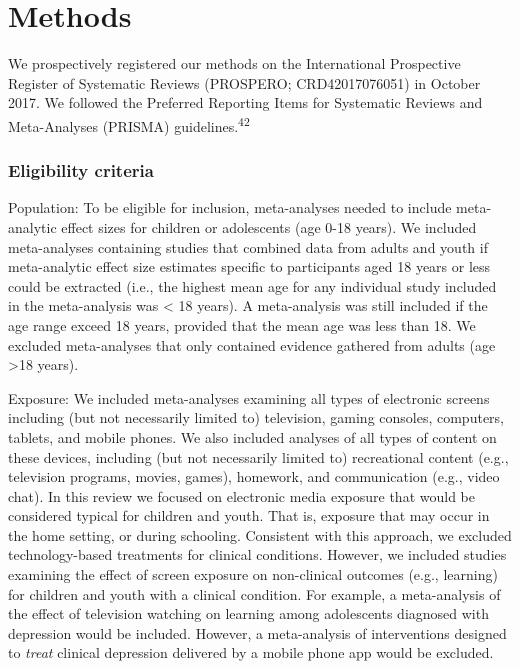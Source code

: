 \documentclass[
  english,
  man]{apa6}
\begin{document}
\hypertarget{methods}{%
\section{Methods}\label{methods}}

We prospectively registered our methods on the International Prospective Register of Systematic Reviews (PROSPERO; CRD42017076051) in October 2017.
We followed the Preferred Reporting Items for Systematic Reviews and Meta-Analyses (PRISMA) guidelines.\textsuperscript{42}

\hypertarget{eligibility-criteria}{%
\subsubsection{Eligibility criteria}\label{eligibility-criteria}}

Population:
To be eligible for inclusion, meta-analyses needed to include meta-analytic effect sizes for children or adolescents (age 0-18 years).
We included meta-analyses containing studies that combined data from adults and youth if meta-analytic effect size estimates specific to participants aged 18 years or less could be extracted (i.e., the highest mean age for any individual study included in the meta-analysis was \textless{} 18 years).
A meta-analysis was still included if the age range exceed 18 years, provided that the mean age was less than 18.
We excluded meta-analyses that only contained evidence gathered from adults (age \textgreater18 years).

Exposure:
We included meta-analyses examining all types of electronic screens including (but not necessarily limited to) television, gaming consoles, computers, tablets, and mobile phones.
We also included analyses of all types of content on these devices, including (but not necessarily limited to) recreational content (e.g., television programs, movies, games), homework, and communication (e.g., video chat).
In this review we focused on electronic media exposure that would be considered typical for children and youth.
That is, exposure that may occur in the home setting, or during schooling.
Consistent with this approach, we excluded technology-based treatments for clinical conditions.
However, we included studies examining the effect of screen exposure on non-clinical outcomes (e.g., learning) for children and youth with a clinical condition.
For example, a meta-analysis of the effect of television watching on learning among adolescents diagnosed with depression would be included.
However, a meta-analysis of interventions designed to \emph{treat} clinical depression delivered by a mobile phone app would be excluded.
\end{document}
